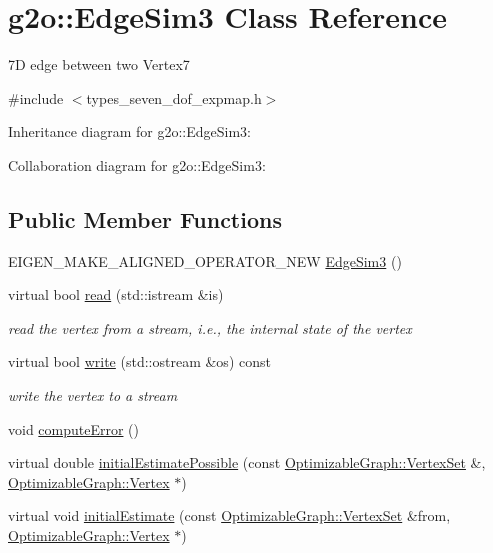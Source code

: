 \hypertarget{classg2o_1_1EdgeSim3}{}\section{g2o\+:\+:Edge\+Sim3 Class Reference}
\label{classg2o_1_1EdgeSim3}


7D edge between two Vertex7  




{\ttfamily \#include $<$types\+\_\+seven\+\_\+dof\+\_\+expmap.\+h$>$}



Inheritance diagram for g2o\+:\+:Edge\+Sim3\+:


Collaboration diagram for g2o\+:\+:Edge\+Sim3\+:
\subsection*{Public Member Functions}
\begin{DoxyCompactItemize}
\item 
E\+I\+G\+E\+N\+\_\+\+M\+A\+K\+E\+\_\+\+A\+L\+I\+G\+N\+E\+D\+\_\+\+O\+P\+E\+R\+A\+T\+O\+R\+\_\+\+N\+EW \hyperlink{classg2o_1_1EdgeSim3_a5a558abf78a1213044e60993f8c8c6d3}{Edge\+Sim3} ()
\item 
virtual bool \hyperlink{classg2o_1_1EdgeSim3_a6c7ad669fa04265475cbfdba3452fcbd}{read} (std\+::istream \&is)
\begin{DoxyCompactList}\small\item\em read the vertex from a stream, i.\+e., the internal state of the vertex \end{DoxyCompactList}\item 
virtual bool \hyperlink{classg2o_1_1EdgeSim3_a50f9e0b48bd9143eb516be36e0c25340}{write} (std\+::ostream \&os) const 
\begin{DoxyCompactList}\small\item\em write the vertex to a stream \end{DoxyCompactList}\item 
void \hyperlink{classg2o_1_1EdgeSim3_a68f55d11f6b8b210318f167d04722a8b}{compute\+Error} ()
\item 
virtual double \hyperlink{classg2o_1_1EdgeSim3_a0fd73623327838b46abdf292582da6ae}{initial\+Estimate\+Possible} (const \hyperlink{classg2o_1_1HyperGraph_a703938cdb4bb636860eed55a2489d70c}{Optimizable\+Graph\+::\+Vertex\+Set} \&, \hyperlink{classg2o_1_1OptimizableGraph_1_1Vertex}{Optimizable\+Graph\+::\+Vertex} $\ast$)
\item 
virtual void \hyperlink{classg2o_1_1EdgeSim3_afac4cc093af6f54adb278c142f33dcca}{initial\+Estimate} (const \hyperlink{classg2o_1_1HyperGraph_a703938cdb4bb636860eed55a2489d70c}{Optimizable\+Graph\+::\+Vertex\+Set} \&from, \hyperlink{classg2o_1_1OptimizableGraph_1_1Vertex}{Optimizable\+Graph\+::\+Vertex} $\ast$)
\end{DoxyCompactItemize}
